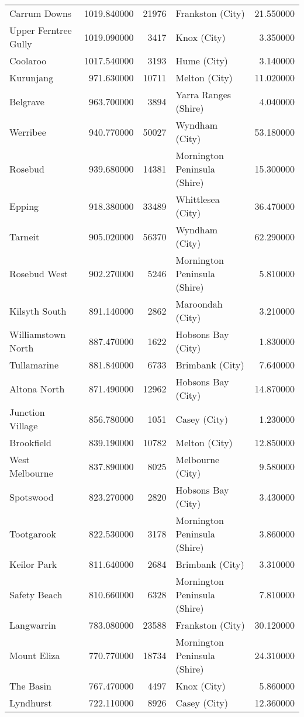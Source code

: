 \begin{longtable}{lrrlr}
Carrum Downs & 1019.840000 & 21976 & Frankston (City) & 21.550000 \\
Upper Ferntree Gully & 1019.090000 & 3417 & Knox (City) & 3.350000 \\
Coolaroo & 1017.540000 & 3193 & Hume (City) & 3.140000 \\
Kurunjang & 971.630000 & 10711 & Melton (City) & 11.020000 \\
Belgrave & 963.700000 & 3894 & Yarra Ranges (Shire) & 4.040000 \\
Werribee & 940.770000 & 50027 & Wyndham (City) & 53.180000 \\
Rosebud & 939.680000 & 14381 & Mornington Peninsula (Shire) & 15.300000 \\
Epping & 918.380000 & 33489 & Whittlesea (City) & 36.470000 \\
Tarneit & 905.020000 & 56370 & Wyndham (City) & 62.290000 \\
Rosebud West & 902.270000 & 5246 & Mornington Peninsula (Shire) & 5.810000 \\
Kilsyth South & 891.140000 & 2862 & Maroondah (City) & 3.210000 \\
Williamstown North & 887.470000 & 1622 & Hobsons Bay (City) & 1.830000 \\
Tullamarine & 881.840000 & 6733 & Brimbank (City) & 7.640000 \\
Altona North & 871.490000 & 12962 & Hobsons Bay (City) & 14.870000 \\
Junction Village & 856.780000 & 1051 & Casey (City) & 1.230000 \\
Brookfield & 839.190000 & 10782 & Melton (City) & 12.850000 \\
West Melbourne & 837.890000 & 8025 & Melbourne (City) & 9.580000 \\
Spotswood & 823.270000 & 2820 & Hobsons Bay (City) & 3.430000 \\
Tootgarook & 822.530000 & 3178 & Mornington Peninsula (Shire) & 3.860000 \\
Keilor Park & 811.640000 & 2684 & Brimbank (City) & 3.310000 \\
Safety Beach & 810.660000 & 6328 & Mornington Peninsula (Shire) & 7.810000 \\
Langwarrin & 783.080000 & 23588 & Frankston (City) & 30.120000 \\
Mount Eliza & 770.770000 & 18734 & Mornington Peninsula (Shire) & 24.310000 \\
The Basin & 767.470000 & 4497 & Knox (City) & 5.860000 \\
Lyndhurst & 722.110000 & 8926 & Casey (City) & 12.360000 \\

\end{longtable}

